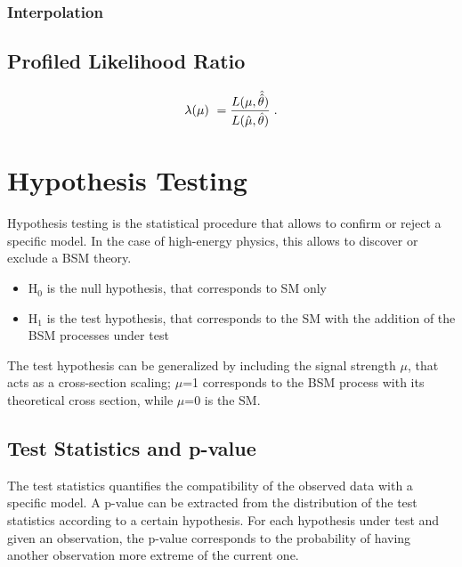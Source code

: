 \subsubsection*{Interpolation}

\subsection{Profiled Likelihood Ratio}

\begin{equation}
\label{eq:stat:prl}
\lambda(\mu) \  = \frac{ L(\mu,
\hat{\hat{\theta}}) } {L(\hat{\mu}, \hat{\theta}) } \;.
\end{equation}


\section{Hypothesis Testing}
\label{sec:stat:ht}

Hypothesis testing is the statistical procedure that allows to confirm or reject a specific model. In the case of high-energy physics, this allows to discover or exclude a BSM theory. 

\begin{itemize}
\item H$_0$ is the null hypothesis, that corresponds to SM only
\item H$_1$ is the test hypothesis, that corresponds to the SM with the addition of the BSM processes under test
\end{itemize}

\noindent The test hypothesis can be generalized by including the signal strength $\mu$, that acts as a cross-section scaling; $\mu$=1 corresponds to the BSM process with its theoretical cross section, while $\mu$=0 is the SM.

\subsection{Test Statistics and p-value}

The test statistics quantifies the compatibility of the observed data with a specific model.
A p-value can be extracted from the distribution of the test statistics according to a certain hypothesis. For each hypothesis under test and given an observation, the p-value corresponds to the probability of having another observation more extreme of the current one.

